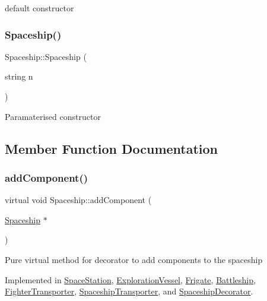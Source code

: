 default constructor \mbox{\label{classSpaceship_a27d48c8aff00407fd50f18522aa5164c}} 
\subsubsection{\texorpdfstring{Spaceship()}{Spaceship()}\hspace{0.1cm}{\footnotesize\ttfamily [2/2]}}
{\footnotesize\ttfamily Spaceship\+::\+Spaceship (\begin{DoxyParamCaption}\item[{string}]{n }\end{DoxyParamCaption})\hspace{0.3cm}{\ttfamily [inline]}}

Paramaterised constructor 

\subsection{Member Function Documentation}
\mbox{\label{classSpaceship_ac1b4673a691cd100708ddea08cd9f192}} 
\subsubsection{\texorpdfstring{add\+Component()}{addComponent()}}
{\footnotesize\ttfamily virtual void Spaceship\+::add\+Component (\begin{DoxyParamCaption}\item[{\hyperlink{classSpaceship}{Spaceship} $\ast$}]{ }\end{DoxyParamCaption})\hspace{0.3cm}{\ttfamily [pure virtual]}}

Pure virtual method for decorator to add components to the spaceship 

Implemented in \hyperlink{classSpaceStation_af78aa518f63655701ff763461522ac7d}{Space\+Station}, \hyperlink{classExplorationVessel_ab7a52cecc1b68a5b9b1c478b00d67f65}{Exploration\+Vessel}, \hyperlink{classFrigate_ae06208eed84e006385e4d337e1f04c7d}{Frigate}, \hyperlink{classBattleship_a975ecf4aaef329705c1e1b3a4584a302}{Battleship}, \hyperlink{classFighterTransporter_a2c001243993307f51abba10636c0fbb9}{Fighter\+Transporter}, \hyperlink{classSpaceshipTransporter_a3e7646b5937a9967885cd3034a2f5637}{Spaceship\+Transporter}, and \hyperlink{classSpaceshipDecorator_a08442441af1fa8979f1e411a5e7b511c}{Spaceship\+Decorator}.

